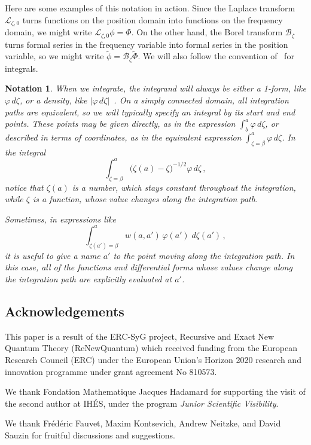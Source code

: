 \documentclass{article}
\newcommand{\series}[1]{\tilde{#1}}
\newcommand{\laplace}{\mathcal{L}}
\newcommand{\borel}{\mathcal{B}}
\theoremstyle{definition}
\theoremstyle{plain}
\newtheorem*{notation*}{Notation}
\newenvironment{revised}{\color{DarkBlue}}{\color{black}}
\newenvironment{revised}{}{}
\begin{document}
Here are some examples of this notation in action. Since the Laplace transform $\laplace_{\zeta, 0}$ turns functions on the position domain into functions on the frequency domain, we might write $\laplace_{\zeta,0} \phi = \Phi$. On the other hand, the Borel transform $\borel_\zeta$ turns formal series in the frequency variable into formal series in the position variable, so we might write $\series{\phi} = \borel_\zeta \series{\Phi}$.
%
\begin{revised}
We will also follow the convention of~\cite{reg-sing-volterra} for integrals. 
\begin{notation*}
When we integrate, the integrand will always be either a 1-form, like $\varphi\,d\zeta$, or a density, like $|\varphi\,d\zeta|$~\cite[Section~1.8]{local-viewpoint}. On a simply connected domain, all integration paths are equivalent, so we will typically specify an integral by its start and end points. These points may be given directly, as in the expression $\int_b^a \varphi\,d\zeta$, or described in terms of coordinates, as in the equivalent expression $\int_{\zeta = \beta}^a \varphi\,d\zeta$. In the integral
\[ \int_{\zeta = \beta}^a \big(\zeta(a) - \zeta\big)^{-1/2} \varphi\,d\zeta\,, \]
notice that $\zeta(a)$ is a number, which stays constant throughout the integration, while $\zeta$ is a function, whose value changes along the integration path.

Sometimes, in expressions like
\[ \int_{\zeta(a') = \beta}^a w(a, a')\,\varphi(a')\;d\zeta(a')\,, \]
it is useful to give a name $a'$ to the point moving along the integration path. In this case, all of the functions and differential forms whose values change along the integration path are explicitly evaluated at $a'$.    
\end{notation*}
%    
\end{revised}
%
\subsection{Acknowledgements}
This paper is a result of the ERC-SyG project, Recursive and Exact New Quantum Theory (ReNewQuantum) which received funding from the European Research Council (ERC) under the European Union's Horizon 2020 research and innovation programme under grant agreement No 810573. 

We thank Fondation Mathematique Jacques Hadamard for supporting the visit of the second author at IH\'ES, under the program \textit{Junior Scientific Visibility}. 

We thank Fr\'{e}d\'{e}ric Fauvet, Maxim Kontsevich, Andrew Neitzke, and David Sauzin for fruitful discussions and suggestions.
%
\end{document}
